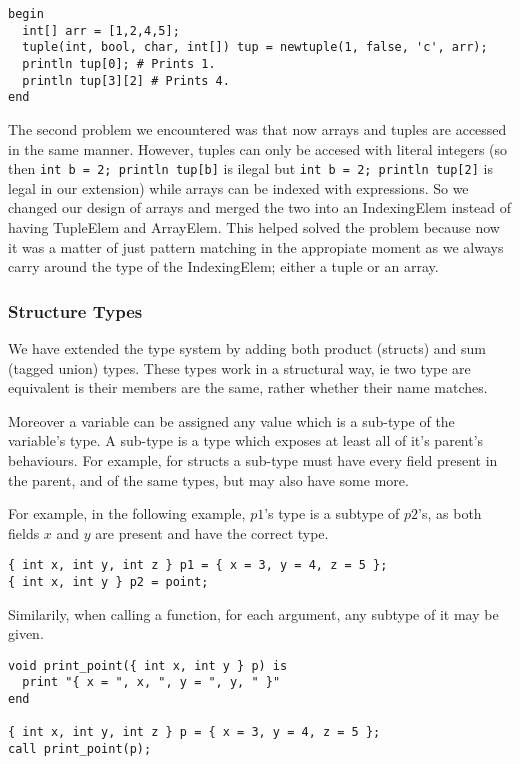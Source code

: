 \documentclass{article}
\begin{document}
\begin{lstlisting}
begin
  int[] arr = [1,2,4,5];
  tuple(int, bool, char, int[]) tup = newtuple(1, false, 'c', arr);
  println tup[0]; # Prints 1.
  println tup[3][2] # Prints 4.
end
\end{lstlisting}

The second problem we encountered was that now arrays and tuples are accessed in the same manner. However, tuples can only be accesed with literal integers (so
then \texttt{int b = 2; println tup[b]} is ilegal but \texttt{int b = 2; println tup[2]} is legal in our extension) while arrays can be indexed with expressions. So we changed our design of arrays and merged the two into an IndexingElem instead of having TupleElem and ArrayElem. This helped solved the problem because now it was a matter of just pattern matching in the appropiate moment as we always carry around the type of the IndexingElem; either a tuple or an array.


\subsubsection{Structure Types}
We have extended the type system by adding both product (structs) and sum (tagged union) types.
These types work in a structural way, ie two type are equivalent is their members are the same,
rather whether their name matches.

Moreover a variable can be assigned any value which is a sub-type of the variable's type. A
sub-type is a type which exposes at least all of it's parent's behaviours. For example, for structs
a sub-type must have every field present in the parent, and of the same types, but may also have some more.

For example, in the following example, $p1$'s type is a subtype of $p2$'s, as both fields $x$ and
$y$ are present and have the correct type.

\begin{lstlisting}
{ int x, int y, int z } p1 = { x = 3, y = 4, z = 5 };
{ int x, int y } p2 = point;
\end{lstlisting}

Similarily, when calling a function, for each argument, any subtype of it may be given.
\begin{lstlisting}
void print_point({ int x, int y } p) is
  print "{ x = ", x, ", y = ", y, " }"
end

{ int x, int y, int z } p = { x = 3, y = 4, z = 5 };
call print_point(p);
\end{lstlisting}
\end{document}
